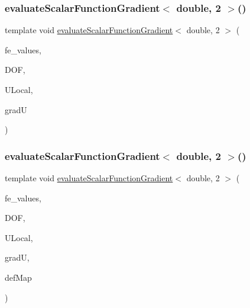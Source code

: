 \mbox{\label{function_evaluations_8cc_aebfcd53aa3d6ed1aade3f0a3b404e790}} 
\subsubsection{\texorpdfstring{evaluateScalarFunctionGradient$<$ double, 2 $>$()}{evaluateScalarFunctionGradient< double, 2 >()}\hspace{0.1cm}{\footnotesize\ttfamily [1/4]}}
{\footnotesize\ttfamily template void \mbox{\hyperlink{group___evaluation_functions_gabedd4ae2841d2332ed0df0513b189e34}{evaluate\+Scalar\+Function\+Gradient}}$<$ double, 2 $>$ (\begin{DoxyParamCaption}\item[{const F\+E\+Values$<$ 2 $>$ \&}]{fe\+\_\+values,  }\item[{unsigned int}]{D\+OF,  }\item[{Table$<$ 1, double $>$ \&}]{U\+Local,  }\item[{Table$<$ 2, double $>$ \&}]{gradU }\end{DoxyParamCaption})}

\mbox{\label{function_evaluations_8cc_a22ad018eab8d203fd930ad1209435d89}} 
\subsubsection{\texorpdfstring{evaluateScalarFunctionGradient$<$ double, 2 $>$()}{evaluateScalarFunctionGradient< double, 2 >()}\hspace{0.1cm}{\footnotesize\ttfamily [2/4]}}
{\footnotesize\ttfamily template void \mbox{\hyperlink{group___evaluation_functions_gabedd4ae2841d2332ed0df0513b189e34}{evaluate\+Scalar\+Function\+Gradient}}$<$ double, 2 $>$ (\begin{DoxyParamCaption}\item[{const F\+E\+Values$<$ 2 $>$ \&}]{fe\+\_\+values,  }\item[{unsigned int}]{D\+OF,  }\item[{Table$<$ 1, double $>$ \&}]{U\+Local,  }\item[{Table$<$ 2, double $>$ \&}]{gradU,  }\item[{\mbox{\hyperlink{structdeformation_map}{deformation\+Map}}$<$ double, 2 $>$ \&}]{def\+Map }\end{DoxyParamCaption})}

